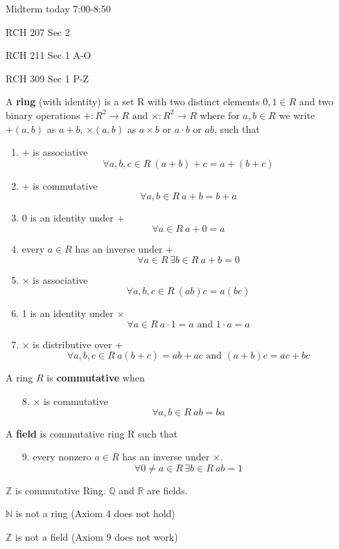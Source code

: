 Midterm today 7:00-8:50

RCH 207 Sec 2

RCH 211 Sec 1 A-O

RCH 309 Sec 1 P-Z

\begin{defn}
A \textbf{ring} (with identity) is a set R with two distinct elements $0,1\in R$ and two binary operations $+:R^2\to R$ and $\times :R^2\to R$ where for $a,b\in R$ we write $+(a,b)$ as $a+b$, $\times(a,b)$ as $a\times b$ or $a\cdot b$ or $ab$, such that 
\begin{enumerate}
\item + is associative \[\forall a,b,c\in R\ (a+b)+c = a+(b+c)\]
\item + is commutative \[\forall a,b\in R \ a+b = b+a\]
\item 0 is an identity under + \[\forall a \in R \ a+0=a\]
\item every $a\in R$ has an inverse under + \[\forall a \in R \, \exists b \in R \ a+b = 0\]
\item $\times$ is associative \[\forall a,b,c\in R\ (ab)c = a(bc)\]
\item 1 is an identity under $\times$ \[\forall a\in R \ a\cdot 1 = a \text{ and } 1\cdot a = a \]
\item $\times$ is distributive over + \[\forall a,b,c\in R \ a(b+c) = ab+ac \text{ and } (a+b)c = ac+bc\]
\end{enumerate}

A ring $R$ is \textbf{commutative} when
\begin{enumerate}
\item[8.] $\times$ is commutative \[\forall a,b\in R \ ab=ba\]
\end{enumerate}

A \textbf{field} is commutative ring R such that 
\begin{enumerate}
\item[9.] every nonzero $a\in R $ has an inverse under $\times$. \[\forall 0\neq a\in R \, \exists b\in R \ ab=1\]
\end{enumerate}
\end{defn}

\begin{thm}
$\mathbb{Z}$ is commutative Ring. $\mathbb{Q}$ and $\mathbb{R}$ are fields.
\end{thm}

\begin{exmp}
$\mathbb{N}$ is not a ring (Axiom 4 does not hold)

$\mathbb{Z}$ is not a field (Axiom 9 does not work)
\end{exmp}

